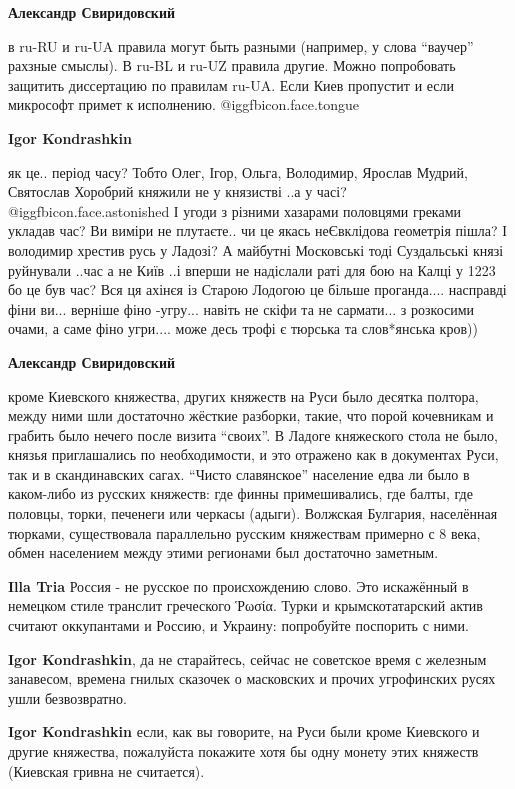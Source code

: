 \begin{itemize}
\begin{itemize}
\textbf{Александр Свиридовский} 

в ru-RU и ru-UA правила могут быть разными (например, у слова \enquote{ваучер} рахзные
смыслы). В ru-BL и ru-UZ правила другие. Можно попробовать защитить диссертацию
по правилам ru-UA. Если Киев пропустит и если микрософт примет к исполнению. @igg{fbicon.face.tongue} 

\textbf{Igor Kondrashkin} 

як це.. період часу? Тобто Олег, Ігор, Ольга, Володимир, Ярослав Мудрий,
Святослав Хоробрий княжили не у князистві ..а у часі? @igg{fbicon.face.astonished} І угоди з різними
хазарами половцями греками укладав час? Ви виміри не плутаєте.. чи це якась
неЄвклідова геометрія пішла? І володимир хрестив русь у Ладозі? А майбутні
Московські тоді Суздальські князі руйнували ..час а не Київ ..і вперши не
надіслали раті для бою на Калці у 1223 бо це був час? Вся ця ахінєя із Старою
Лодогою це більше проганда.... насправді фіни ви... верніше фіно -угру... навіть
не скіфи та не сармати... з розкосими очами, а саме фіно угри.... може десь трофі
є тюрська та слов*янська кров))


\textbf{Александр Свиридовский} 

кроме Киевского княжества, других княжеств на Руси было десятка полтора, между
ними шли достаточно жёсткие разборки, такие, что порой кочевникам и грабить
было нечего после визита \enquote{своих}. В Ладоге княжеского стола не было, князья
приглашались по необходимости, и это отражено как в документах Руси, так и в
скандинавских сагах. \enquote{Чисто славянское} население едва ли было в каком-либо из
русских княжеств: где финны примешивались, где балты, где половцы, торки,
печенеги или черкасы (адыги). Волжская Булгария, населённая тюрками,
существовала параллельно русским княжествам примерно с 8 века, обмен населением
между этими регионами был достаточно заметным.


\textbf{Illa Tria} Россия - не русское по происхождению слово. Это искажённый в немецком стиле транслит греческого Ῥωσία. Турки и крымскотатарский актив считают оккупантами и Россию, и Украину: попробуйте поспорить с ними.

\textbf{Igor Kondrashkin}, да не старайтесь, сейчас не советское время с железным занавесом, времена гнилых сказочек о масковских и прочих угрофинских русях ушли безвозвратно.

\textbf{Igor Kondrashkin} если, как вы говорите, на Руси были кроме Киевского и другие княжества, пожалуйста покажите хотя бы одну монету этих княжеств (Киевская гривна не считается).


\end{itemize}
\end{itemize}
